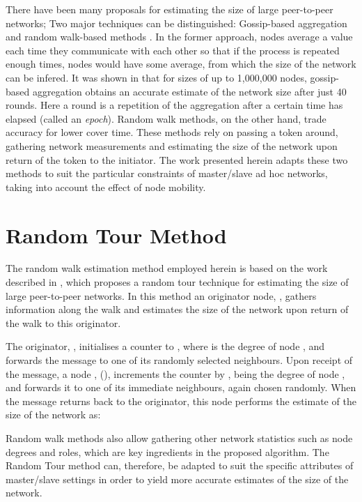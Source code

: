 \documentclass[twocolumn,10pt,conference]{IEEEtran}
\begin{document}
There have been many proposals for estimating the size of large peer-to-peer networks; Two major techniques can be 
distinguished: Gossip-based aggregation\cite{ref21,ref22} and random walk-based methods \cite{ref20,ref23}. In the former approach, nodes average a value each time they 
communicate with each other so that if the process is repeated enough times, nodes would have some average, from which 
the size of the network can be infered. It was shown in \cite{ref24} that for sizes of up to 1,000,000 nodes, 
gossip-based aggregation obtains an accurate estimate of the network size after just 40 rounds. Here a round is a repetition 
of the aggregation after a certain time has elapsed (called an \textit{epoch}). Random walk methods, on the other hand, 
trade accuracy for lower cover time. These methods rely on passing a token around, gathering network measurements and estimating the size 
of the network upon return of the token to the initiator. The 
work presented herein adapts these two methods to suit the particular constraints of master/slave ad hoc networks, taking into account the effect of node mobility.

\section{Random Tour Method}
The random walk estimation method employed herein is based on the work described in \cite{ref20}, which 
proposes a random tour technique for estimating the size of large peer-to-peer networks. In this method an originator node, 
, gathers information along the walk and estimates the size of the network upon return of the walk to this originator. 

The originator, , initialises a counter  to , where  is the degree of node , 
and forwards the message to one of its randomly selected neighbours. Upon receipt of the message, a node , (), 
increments the counter by ,  being the degree of node , and forwards it to one of its immediate 
neighbours, again chosen randomly.
When the message returns back to the originator, this node performs the estimate of the size of the network as: 


Random walk methods also allow gathering other network statistics \cite{ref25} such as node degrees and roles, which are 
key ingredients in the proposed algorithm. The Random Tour method \cite{ref20} can, therefore, be adapted to suit the 
specific attributes of master/slave settings in order to yield more accurate estimates of the size of the network. 
\end{document}
